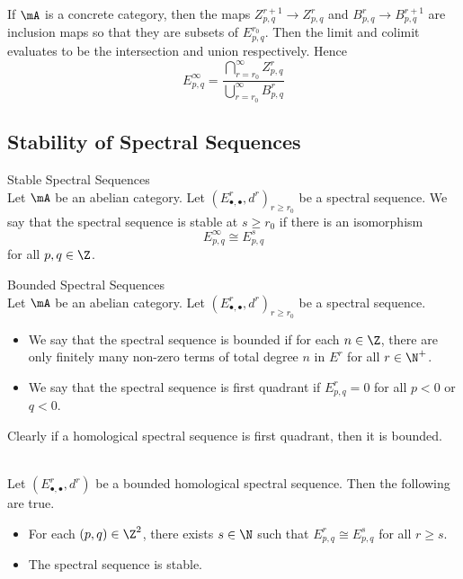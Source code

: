 \documentclass[a4paper]{article}
\begin{document}
If $\mA$ is a concrete category, then the maps $Z_{p,q}^{r+1}\to Z_{p,q}^r$ and $B_{p,q}^r\to B_{p,q}^{r+1}$ are inclusion maps so that they are subsets of $E_{p,q}^{r_0}$. Then the limit and colimit evaluates to be the intersection and union respectively. Hence $$E_{p,q}^\infty=\frac{\bigcap_{r=r_0}^\infty Z_{p,q}^r}{\bigcup_{r=r_0}^\infty B_{p,q}^r}$$

\subsection{Stability of Spectral Sequences}
\begin{defn}{Stable Spectral Sequences}{}\\
Let $\mA$ be an abelian category. Let $(E_{\bullet,\bullet}^r,d^r)_{r\geq r_0}$ be a spectral sequence. We say that the spectral sequence is stable at $s\geq r_0$ if there is an isomorphism $$E_{p,q}^\infty\cong E_{p,q}^s$$ for all $p,q\in\Z$. 
\end{defn}

\begin{defn}{Bounded Spectral Sequences}{}\\
Let $\mA$ be an abelian category. Let $(E_{\bullet,\bullet}^r,d^r)_{r\geq r_0}$ be a spectral sequence. 
\begin{itemize}
\item We say that the spectral sequence is bounded if for each $n\in\Z$, there are only finitely many non-zero terms of total degree $n$ in $E^r$ for all $r\in\N^+$. 
\item We say that the spectral sequence is first quadrant if $E_{p,q}^r=0$ for all $p<0$ or $q<0$. 
\end{itemize}
\end{defn}

Clearly if a homological spectral sequence is first quadrant, then it is bounded. 

\begin{lmm}{}{}\\
Let $(E_{\bullet,\bullet}^r,d^r)$ be a bounded homological spectral sequence. Then the following are true. 
\begin{itemize}
\item For each $(p,q)\in\Z^2$, there exists $s\in\N$ such that $E_{p,q}^r\cong E_{p,q}^s$ for all $r\geq s$. 
\item The spectral sequence is stable. 
\end{itemize}
\end{lmm}
\end{document}
